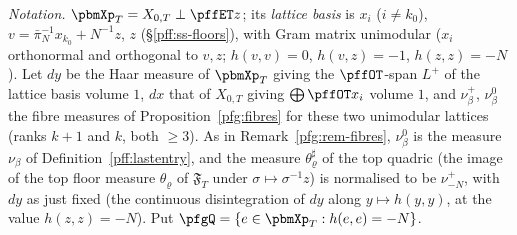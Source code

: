 \documentclass[10pt]{amsart}
\theoremstyle{definition}
\theoremstyle{remark}
\begin{document}
\emph{Notation.} $\pbmXp_T=X_{0,T}\perp\pffET z$; its \emph{lattice basis} is $x_i$ ($i\ne k_0$), $v=\bar\pi_N^{-1}x_{k_0}+N^{-1}z$,
$z$ (\S\ref{pff:ss-floors}), with Gram matrix unimodular ($x_i$ orthonormal and orthogonal to $v,z$; $h(v,v)=0$,
$h(v,z)=-1$, $h(z,z)=-N$). Let $dy$ be the Haar measure of $\pbmXp_T$ giving the $\pffOT$-span $L^+$ of the lattice basis
volume $1$, $dx$ that of $X_{0,T}$ giving $\bigoplus\pffOT x_i$ volume $1$, and $\nu^+_\beta$, $\nu^0_\beta$ the fibre
measures of Proposition~\ref{pfg:fibres} for these two unimodular lattices (ranks $k+1$ and $k$, both $\ge3$). As in
Remark~\ref{pfg:rem-fibres}, $\nu^0_\beta$ is the measure $\nu_\beta$ of Definition~\ref{pff:lastentry}, and the measure
$\theta^\sharp_\varrho$ of the top quadric (the image of the top floor measure $\theta_\varrho$ of $\mathfrak F_T$ under
$\sigma\mapsto\sigma^{-1}z$) is normalised to be $\nu^+_{-N}$, with $dy$ as just fixed (the continuous disintegration of $dy$ along $y\mapsto h(y,y)$, at
the value $h(z,z)=-N$). Put $\pfgQ=\{e\in\pbmXp_T:h(e,e)=-N\}$.
\end{document}
